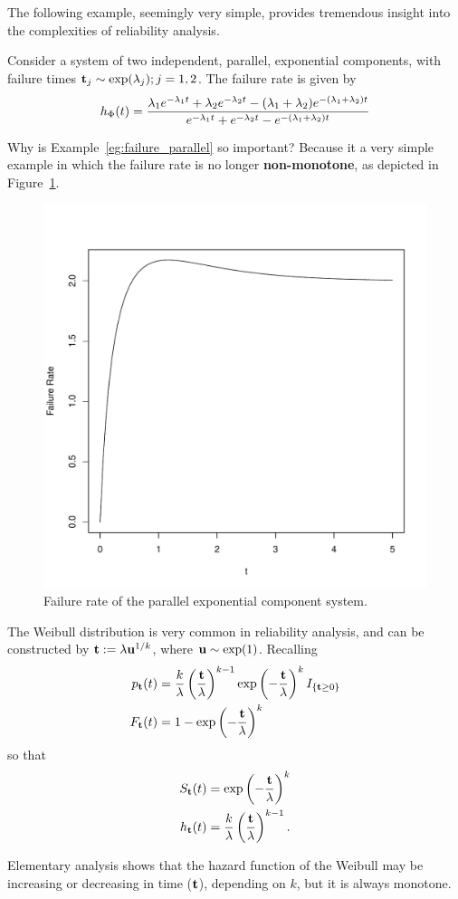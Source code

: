The following example, seemingly very simple, provides tremendous insight into the complexities of reliability analysis.
\begin{example}
\label{eg:failure_parallel}
Consider a system of two independent, parallel, exponential components, with failure times $\mathbf{t}_j\sim \exp(\lambda_j); j=1,2$.
The failure rate is given by
\begin{align}
	h_{\Phi} (t)=
	\frac
	{\lambda_1 e^{-\lambda_1 t} + \lambda_2 e^{-\lambda_2 t}  - (\lambda_1+ \lambda_2) e^{-(\lambda_1+ \lambda_2) t}}
	{e^{-\lambda_1 t} + e^{-\lambda_2 t} - e^{-(\lambda_1+ \lambda_2) t}}
\end{align}
\end{example}
Why is Example~\ref{eg:failure_parallel} so important?
Because it a very simple example in which the failure rate is no longer \textbf{non-monotone}, as depicted in Figure~\ref{fig:hazard_non_monotone}. 


\begin{figure}[ht]
\centering
\includegraphics[width=0.5\linewidth]{art/hazard}
\caption{Failure rate of the parallel exponential component system.}
\label{fig:hazard_non_monotone}
\end{figure}





\begin{example}
The Weibull distribution is very common in reliability analysis, and can be constructed by 
$\mathbf{t} := \lambda \mathbf{u}^{1/k}$, where $\mathbf{u} \sim \exp(1)$. 
Recalling
\begin{align}
	p_{\mathbf{t}} (t) &= \frac{k}{\lambda}\left(\frac{\mathbf{t}}{\lambda} \right)^{k-1} \exp\left(-\frac{\mathbf{t}}{\lambda} \right)^k  I_{\{ \mathbf{t}\geq 0 \}} \\
	F_{\mathbf{t}} (t) &= 1 - \exp \left(-\frac{\mathbf{t}}{\lambda} \right)^k 
\end{align}
so that 
\begin{align}
	S_{\mathbf{t}} (t) &= \exp \left(-\frac{\mathbf{t}}{\lambda} \right)^k \\
	h_{\mathbf{t}} (t) &= \frac{k}{\lambda} \left(\frac{\mathbf{t}}{\lambda} \right)^{k-1} .
\end{align}
\end{example}
Elementary analysis shows that the hazard function of the Weibull may be increasing or decreasing in time ($\mathbf{t}$), depending on $k$, but it is always monotone.




